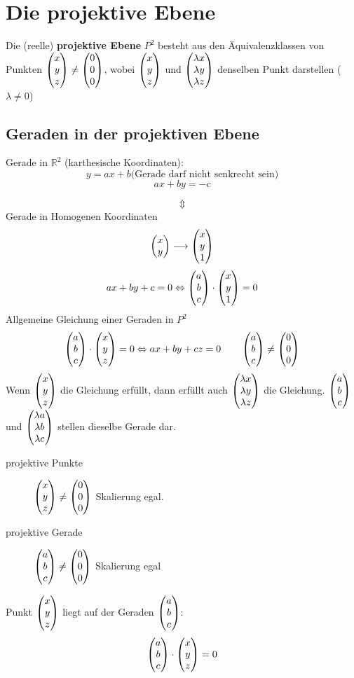 \section{Die projektive Ebene}
\Defi Die (reelle) \textbf{projektive Ebene} $P^2$ besteht aus den Äquivalenzklassen von Punkten
	$\begin{pmatrix}x\\y\\z\end{pmatrix} \neq \begin{pmatrix}0\\0\\0\end{pmatrix}$, wobei $\begin{pmatrix}x\\y\\z\end{pmatrix}$ und $\begin{pmatrix}\lambda x\\\lambda y\\\lambda z\end{pmatrix}$
	denselben Punkt darstellen ($\lambda \neq 0$)

\subsection{Geraden in der projektiven Ebene}
Gerade in $\mathbb{R}^2$ (karthesische Koordinaten):
 \[y = ax + b \text{(Gerade darf nicht senkrecht sein)}\]
 \[ax + by = -c\]

\[\Updownarrow\]
Gerade in Homogenen Koordinaten
\[\begin{pmatrix}x\\y\end{pmatrix} \longrightarrow \begin{pmatrix}x\\y\\1\end{pmatrix}\]
\[ax + by + c = 0 \Leftrightarrow \begin{pmatrix}a\\b\\c\end{pmatrix} \cdot \begin{pmatrix}x\\y\\1\end{pmatrix} = 0\]
Allgemeine Gleichung einer Geraden in $P^2$
\[\begin{pmatrix}a\\b\\c\end{pmatrix} \cdot \begin{pmatrix}x\\y\\z\end{pmatrix} = 0 \Leftrightarrow ax + by + cz = 0 \qquad \begin{pmatrix}a\\b\\c\end{pmatrix} \neq \begin{pmatrix}0\\0\\0\end{pmatrix}\]
Wenn $\begin{pmatrix}x\\y\\z\end{pmatrix}$ die Gleichung erfüllt, dann erfüllt auch $\begin{pmatrix}\lambda x\\\lambda y\\\lambda z\end{pmatrix}$ die Gleichung.
$\begin{pmatrix}a\\b\\c\end{pmatrix}$ und $\begin{pmatrix}\lambda a\\\lambda b\\\lambda c\end{pmatrix}$ stellen dieselbe Gerade dar.

\begin{description}
 \item[projektive Punkte] $\begin{pmatrix}x\\y\\z\end{pmatrix} \neq \begin{pmatrix}0\\0\\0\end{pmatrix}$ Skalierung egal.
 \item[projektive Gerade] $\begin{pmatrix}a\\b\\c\end{pmatrix} \neq \begin{pmatrix}0\\0\\0\end{pmatrix}$ Skalierung egal
\end{description}
\Satz Punkt $\begin{pmatrix}x\\y\\z\end{pmatrix}$ liegt auf der Geraden $\begin{pmatrix}a\\b\\c\end{pmatrix}$:
\[\begin{pmatrix}a\\b\\c\end{pmatrix} \cdot \begin{pmatrix}x\\y\\z\end{pmatrix} = 0\]

